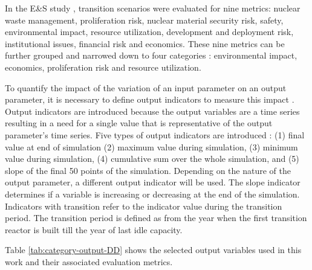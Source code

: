 In the E\&S study 
\cite{wigeland_nuclear_2014}, transition 
scenarios were evaluated for nine metrics: nuclear waste 
management, proliferation risk, nuclear material security risk, 
safety, environmental impact, resource utilization, development 
and deployment risk, institutional issues, financial risk and 
economics. 
These nine metrics can be further grouped and narrowed down to 
four categories \cite{passerini_systematic_2014}: environmental 
impact, economics, proliferation risk and resource utilization. 

To quantify the impact of the variation of an input parameter 
on an output parameter, it is necessary to define output indicators 
to measure this impact \cite{noauthor_effects_2017}. 
Output indicators are introduced because the output variables
are a time series resulting in a need for a single value that 
is representative of the output parameter's time series.  
Five types of output indicators are introduced 
\cite{noauthor_effects_2017}: 
(1) final value at end of simulation
(2) maximum value during simulation, 
(3) minimum value during simulation, 
(4) cumulative sum over the whole simulation, and 
(5) slope of the final 50 points of the simulation.
Depending on the nature of the output parameter, a different 
output indicator will be used. 
The slope indicator determines if a variable is increasing or 
decreasing at the end of the simulation. 
Indicators with transition refer to the indicator value during the 
transition period. 
The transition period is defined as from the year when the first 
transition reactor is built till the year of last idle capacity. 

Table \ref{tab:category-output-DD} shows the selected 
output variables used in this work and their associated 
evaluation metrics. 

